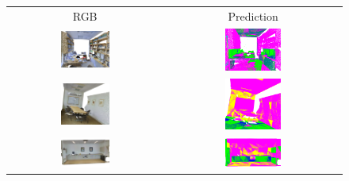     \begin{figure}
        \centering
        \begin{tabular}{cc}
            RGB & Prediction \\
            \includegraphics[width=0.33\textwidth, height=0.18\textheight]{images/seg_output/s3dis_DE/S3DIS_1_RGB.png} &
            \includegraphics[width=0.33\textwidth, height=0.18\textheight]{images/seg_output/s3dis_DE/S3DIS_1_Pred.png}\\

            \includegraphics[width=0.33\textwidth, height=0.18\textheight]{images/seg_output/s3dis_DE/S3DIS_2_RGB.png} &
            \includegraphics[width=0.33\textwidth, height=0.18\textheight]{images/seg_output/s3dis_DE/S3DIS_2_Pred.png}\\
            
            \includegraphics[width=0.33\textwidth, height=0.18\textheight]{images/seg_output/s3dis_DE/S3DIS_3_RGB.png} &
            \includegraphics[width=0.33\textwidth, height=0.18\textheight]{images/seg_output/s3dis_DE/S3DIS_3_Pred.png}\\


\end{tabular}
\end{figure}
